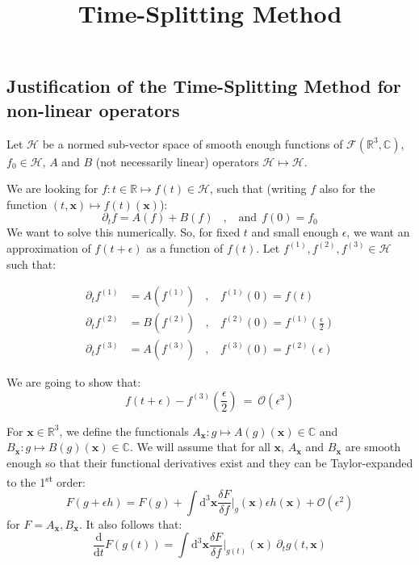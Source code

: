 \documentclass[11pt]{article}
\title{Time-Splitting Method}
\author{}
\date{}
\newcommand{\fder}[2]{\frac{\delta #1}{\delta f}\Bigr|_{#2}}
\begin{document}
\maketitle

\subsection*{Justification of the Time-Splitting Method for non-linear operators}

Let $\mathcal{H}$ be a normed sub-vector space of smooth enough functions of $\mathcal{F}(\mathbb{R}^3,\mathbb{C})$, $f_0\in \mathcal{H}$, $A$ and $B$ (not necessarily linear) operators $\mathcal{H} \longmapsto \mathcal{H}$.\par
We are looking for $f:t\in \mathbb{R} \longmapsto f(t)\in \mathcal{H}$, such that (writing $f$ also for the function $(t,\mathbf{x}) \longmapsto f(t)(\mathbf{x})$):
\begin{equation}\label{initialEq}
    \partial_t f = A(f) + B(f)~~~~,~~~~\text{and} ~~ f(0)=f_0
\end{equation}
We want to solve this numerically. So, for fixed $t$ and small enough $\epsilon$, we want an approximation of $f(t+\epsilon)$ as a function of $f(t)$. Let $f^{(1)},f^{(2)},f^{(3)}\in \mathcal{H}$ such that:

\begin{equation}\label{TSM}
\begin{split}
    \partial_t f^{(1)} &= A(f^{(1)})~~~~,~~~~ f^{(1)}(0)=f(t)\\
    \partial_t f^{(2)} &= B(f^{(2)})~~~~,~~~~ f^{(2)}(0)=f^{(1)}(\frac{\epsilon}{2})\\
    \partial_t f^{(3)} &= A(f^{(3)})~~~~,~~~~ f^{(3)}(0)=f^{(2)}(\epsilon)
    \end{split}
\end{equation}

We are going to show that:
\begin{equation}\label{Theo}
    f(t+\epsilon)-f^{(3)}(\frac{\epsilon}{2}) ~=~ \mathcal{O}(\epsilon^3)
\end{equation}

For $\mathbf{x}\in \mathbb{R}^3$, we define the functionals $A_\mathbf{x} : g \longmapsto A(g)(\mathbf{x})\in \mathbb{C}$ and $B_\mathbf{x} : g \longmapsto B(g)(\mathbf{x})\in \mathbb{C}$. We will assume that for all $\mathbf{x}$, $A_\mathbf{x}$ and $B_\mathbf{x}$ are smooth enough so that their functional derivatives exist and they can be Taylor-expanded to the 1\textsuperscript{st} order:
\begin{equation}\label{Taylor}
    F(g+\epsilon h)=F(g)+\int\text{d}^3\mathbf{x}\fder{F}{g}(\mathbf{x})\epsilon h(\mathbf{x})+\mathcal{O}(\epsilon^2)
\end{equation}
for $F=A_\mathbf{x},B_\mathbf{x}$. It also follows that:
\begin{equation}\label{totalder}
    \frac{\text{d}}{\text{d}t}F(g(t))=\int\text{d}^3\mathbf{x}\fder{F}{g(t)}(\mathbf{x})~\partial_t g(t,\mathbf{x})
\end{equation}
\end{document}
